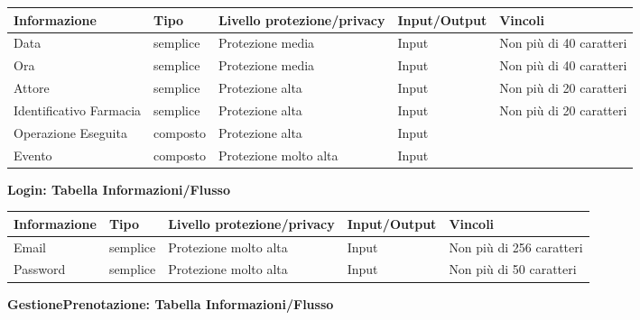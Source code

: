 \begin{tabular} {|P{3cm}|P{3cm}|P{3cm}|P{3cm}|P{3cm}|}
    \hline
    \textbf{Informazione} & \textbf{Tipo} & \textbf{Livello protezione/privacy} &  \textbf{Input/Output} & \textbf{Vincoli} \\
    \hline
    Data  & semplice & Protezione media & Input & Non più di 40 caratteri \\
    \hline
    Ora & semplice & Protezione media & Input & Non più di 40 caratteri \\
    \hline
    Attore & semplice & Protezione alta & Input & Non più di 20 caratteri \\
    \hline
    Identificativo Farmacia & semplice & Protezione alta & Input & Non più di 20 caratteri \\
    \hline
    Operazione Eseguita & composto & Protezione alta & Input & \\
    \hline
    Evento & composto & Protezione molto alta & Input &  \\
    \hline
\end{tabular}

\newpage

\textbf{Login: Tabella Informazioni/Flusso}
\hfill \break

\begin{tabular} {|P{3cm}|P{3cm}|P{3cm}|P{3cm}|P{3cm}|}
    \hline
    \textbf{Informazione} & \textbf{Tipo} & \textbf{Livello protezione/privacy} & \textbf{Input/Output} & \textbf{Vincoli} \\
    \hline
    Email & semplice & Protezione molto alta & Input & Non più di 256 caratteri \\
    \hline
    Password & semplice & Protezione molto alta & Input & Non più di 50 caratteri \\
    \hline
\end{tabular}
\hfill \break

\textbf{GestionePrenotazione: Tabella Informazioni/Flusso}
\hfill \break

